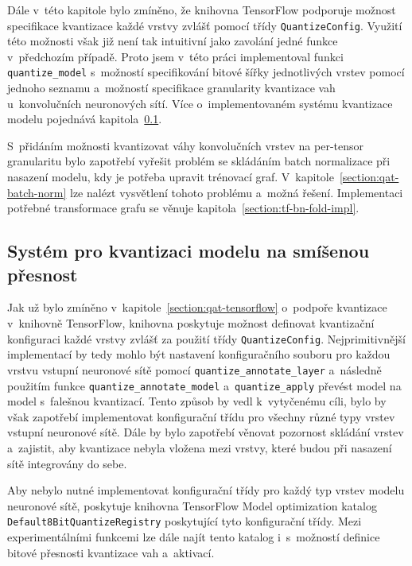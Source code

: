 Dále v~této kapitole bylo zmíněno, že knihovna TensorFlow podporuje možnost specifikace kvantizace každé vrstvy zvlášť pomocí třídy \verb|QuantizeConfig|. Využití této možnosti však již není tak intuitivní jako zavolání jedné funkce v~předchozím případě. Proto jsem v~této práci implementoval funkci \verb|quantize_model| s~možností specifikování bitové šířky jednotlivých vrstev pomocí jednoho seznamu a~možností specifikace granularity kvantizace vah u~konvolučních neuronových sítí. Více o~implementovaném systému kvantizace modelu pojednává kapitola~\ref{section:tf-mixed-precission-impl}.

S~přidáním možnosti kvantizovat váhy konvolučních vrstev na per-tensor granularitu bylo zapotřebí vyřešit problém se skládáním batch normalizace při nasazení modelu, kdy je potřeba upravit trénovací graf. V~kapitole~\ref{section:qat-batch-norm} lze nalézt vysvětlení tohoto problému a~možná řešení. Implementaci potřebné transformace grafu se věnuje kapitola~\ref{section:tf-bn-fold-impl}.

\subsection{Systém pro kvantizaci modelu na smíšenou přesnost}
\label{section:tf-mixed-precission-impl}

Jak už bylo zmíněno v~kapitole~\ref{section:qat-tensorflow} o~podpoře kvantizace v~knihovně TensorFlow, knihovna poskytuje možnost definovat kvantizační konfiguraci každé vrstvy zvlášť za použití třídy \verb|QuantizeConfig|. Nejprimitivnější implementací by tedy mohlo být nastavení konfiguračního souboru pro každou vrstvu vstupní neuronové sítě pomocí \verb|quantize_annotate_layer| a~následně použitím funkce \verb|quantize_annotate_model| a~\verb|quantize_apply| převést model na model s~falešnou kvantizací. Tento způsob by vedl k~vytyčenému cíli, bylo by však zapotřebí implementovat konfigurační třídu pro všechny různé typy vrstev vstupní neuronové sítě. Dále by bylo zapotřebí věnovat pozornost skládání vrstev a~zajistit, aby kvantizace nebyla vložena mezi vrstvy, které budou při nasazení sítě integrovány do sebe.

Aby nebylo nutné implementovat konfigurační třídy pro každý typ vrstev modelu neuronové sítě, poskytuje knihovna TensorFlow Model optimization katalog \texttt{Default8BitQuanti\-zeRegistry} poskytující tyto konfigurační třídy. Mezi experimentálními funkcemi lze dále najít tento katalog i~s~možností definice bitové přesnosti kvantizace vah a~aktivací.

